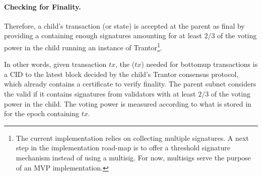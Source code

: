 
 \paragraph{Checking for Finality.}
Therefore, a child's transaction (or state) \tx is accepted at the parent as final by providing a \prf containing enough signatures amounting for at least $2/3$ of the voting power in the child running an instance of Trantor\footnote{The current implementation relies on collecting multiple signatures. A next step in the implementation road-map is to offer a threshold signature mechanism instead of using a multisig. For now, multisigs serve the purpose of an MVP implementation.}.
 
 In other words, given transaction $tx$, the \prf($tx$) needed for bottomup transactions is a CID to the latest block decided by the child's Trantor consensus protocol, which already contains a certificate to verify finality. The parent subnet considers the \prf valid if it contains signatures from validators with at least $2/3$ of the voting power in the child. The voting power is measured according to what is stored in \sa for the epoch containing $tx$. 


